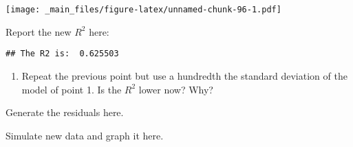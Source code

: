 \documentclass[
]{book}
\newenvironment{Shaded}{\begin{snugshade}}{\end{snugshade}}
\newcommand{\AttributeTok}[1]{\textcolor[rgb]{0.13,0.29,0.53}{#1}}
\newcommand{\CommentTok}[1]{\textcolor[rgb]{0.56,0.35,0.01}{\textit{#1}}}
\newcommand{\DecValTok}[1]{\textcolor[rgb]{0.00,0.00,0.81}{#1}}
\newcommand{\FloatTok}[1]{\textcolor[rgb]{0.00,0.00,0.81}{#1}}
\newcommand{\FunctionTok}[1]{\textcolor[rgb]{0.13,0.29,0.53}{\textbf{#1}}}
\newcommand{\NormalTok}[1]{#1}
\newcommand{\OtherTok}[1]{\textcolor[rgb]{0.56,0.35,0.01}{#1}}
\newcommand{\SpecialCharTok}[1]{\textcolor[rgb]{0.81,0.36,0.00}{\textbf{#1}}}
\newcommand{\StringTok}[1]{\textcolor[rgb]{0.31,0.60,0.02}{#1}}
\providecommand{\tightlist}{%
  \setlength{\itemsep}{0pt}\setlength{\parskip}{0pt}}
\begin{document}
\texttt{[image: \_main\_files/figure-latex/unnamed-chunk-96-1.pdf]}

Report the new \(R^2\) here:

\begin{Shaded}
\end{Shaded}

\begin{verbatim}
## The R2 is:  0.625503
\end{verbatim}

\begin{enumerate}
\def\labelenumi{\arabic{enumi}.}
\setcounter{enumi}{7}
\tightlist
\item
  Repeat the previous point but use a hundredth the standard deviation of the model of point 1. Is the \(R^2\) lower now? Why?
\end{enumerate}

Generate the residuals here.

\begin{Shaded}
\end{Shaded}

Simulate new data and graph it here.
\end{document}
